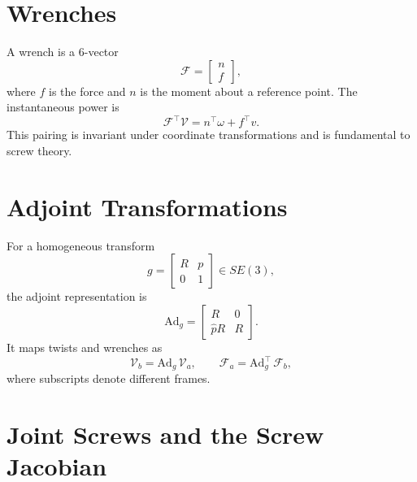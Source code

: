 \documentclass[12pt]{article}
\begin{document}
\section{Wrenches}

A wrench is a 6-vector
\begin{equation}
\mathcal{F} =
\begin{bmatrix}
n \\ f
\end{bmatrix},
\end{equation}
where $f$ is the force and $n$ is the moment about a reference point. The instantaneous power is
\begin{equation}
\mathcal{F}^\top \mathcal{V}
= n^\top \omega + f^\top v.
\end{equation}
This pairing is invariant under coordinate transformations and is fundamental to screw theory.

\section{Adjoint Transformations}

For a homogeneous transform
\begin{equation}
g =
\begin{bmatrix}
R & p \\
0 & 1
\end{bmatrix}
\in SE(3),
\end{equation}
the adjoint representation is
\begin{equation}
\mathrm{Ad}_g
=
\begin{bmatrix}
R & 0 \\
\hat{p}R & R
\end{bmatrix}.
\end{equation}
It maps twists and wrenches as
\begin{equation}
\mathcal{V}_b = \mathrm{Ad}_g \,\mathcal{V}_a, \qquad
\mathcal{F}_a = \mathrm{Ad}_g^\top \,\mathcal{F}_b,
\end{equation}
where subscripts denote different frames.

\section{Joint Screws and the Screw Jacobian}
\end{document}
